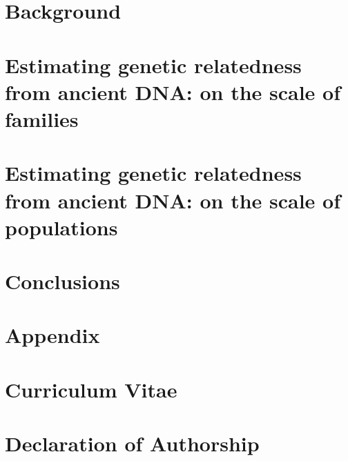 \documentclass[12pt]{report}
\begin{document}
\chapter{Background}
\setcounter{page}{1}



\chapter{Estimating genetic relatedness from ancient DNA: on the scale of families}\label{chapter_kin}


\chapter{Estimating genetic relatedness from ancient DNA: on the scale of populations}\label{chapter_ppca}


\chapter{Conclusions}\label{conclusions}



\chapter*{Appendix}





\chapter*{Curriculum Vitae}



\chapter*{Declaration of Authorship}

\end{document}
